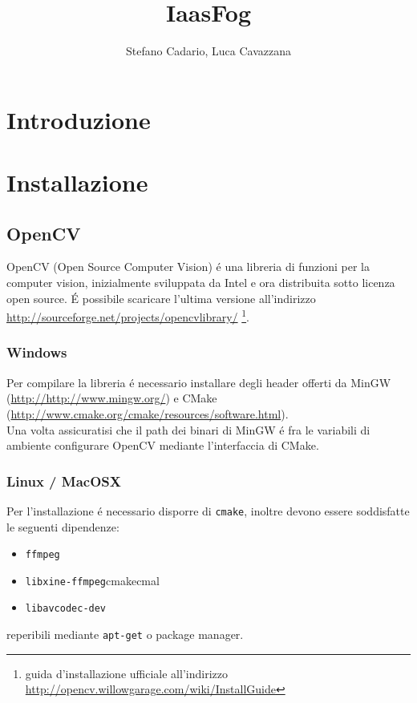 \documentclass[12pt]{article}
\title {IaasFog}
\author{Stefano Cadario, Luca Cavazzana}
\begin{document}
\maketitle
\data{\date}

\tableofcontents

\chapter{Introduzione}
\chapter{Installazione}
\section{OpenCV}
OpenCV (Open Source Computer Vision) \'e una libreria di funzioni per la computer vision, inizialmente sviluppata da Intel e ora distribuita sotto licenza open source. \'E possibile scaricare l'ultima versione all'indirizzo \url{http://sourceforge.net/projects/opencvlibrary/} \footnote{guida d'installazione ufficiale all'indirizzo \url{http://opencv.willowgarage.com/wiki/InstallGuide}}.

\subsection{Windows}
Per compilare la libreria \'e necessario installare degli header offerti da MinGW (\url{http://http://www.mingw.org/}) e CMake (\url{http://www.cmake.org/cmake/resources/software.html}).\\
\noindent Una volta assicuratisi che il path dei binari di MinGW \'e fra le variabili di ambiente configurare OpenCV mediante l'interfaccia di CMake.

\subsection{Linux / MacOSX}

\noindent Per l'installazione \'e necessario disporre di \verb|cmake|, inoltre devono essere soddisfatte le seguenti dipendenze:
\begin{itemize}
\item \verb|ffmpeg|
\item \verb|libxine-ffmpeg|cmakecmal
\item \verb|libavcodec-dev|
\end{itemize}

\noindent reperibili mediante \verb|apt-get| o package manager.\\
\end{document}
